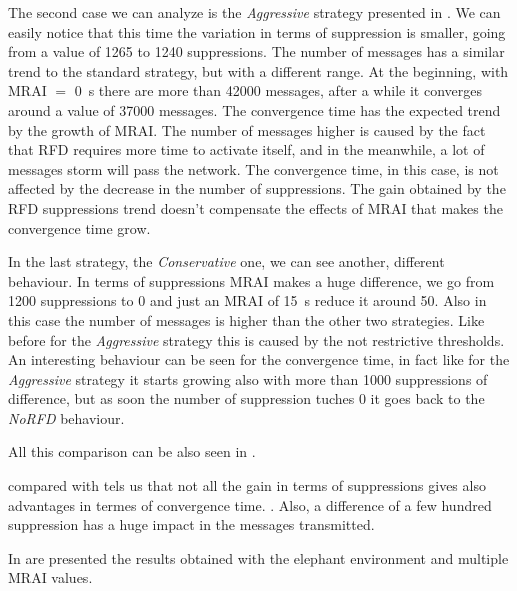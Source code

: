 The second case we can analyze is the \textit{Aggressive} strategy presented
in .
We can easily notice that this time the variation in terms of suppression is smaller,
going from a value of \num{1265} to \num{1240} suppressions.
The number of messages has a similar trend to the standard strategy, but with
a different range.
At the beginning, with \ac{MRAI} $=$ \SI{0}{\second} there are more than \num{42000}
messages, after a while it converges around a value of \num{37000} messages.
The convergence time has the expected trend by the growth of \ac{MRAI}.
The number of messages higher is caused by the fact that \ac{RFD} requires more time
to activate itself, and in the meanwhile, a lot of messages storm will pass the
network.
The convergence time, in this case, is not affected by the decrease in the number
of suppressions.
The gain obtained by the \ac{RFD} suppressions trend doesn't compensate the 
effects of \ac{MRAI} that makes the convergence time grow.

In the last strategy, the \textit{Conservative} one, we can see another, different
behaviour.
In terms of suppressions \ac{MRAI} makes a huge difference, we go from \num{1200}
suppressions to \num{0} and just an \ac{MRAI} of \SI{15}{\second} reduce it around
\num{50}.
Also in this case the number of messages is higher than the other two strategies.
Like before for the \textit{Aggressive} strategy this is caused by the not
restrictive thresholds.
An interesting behaviour can be seen for the convergence time, in fact like for
the \textit{Aggressive} strategy it starts growing also with more than \num{1000}
suppressions of difference, but as soon the number of suppression tuches \num{0}
it goes back to the \textit{NoRFD} behaviour.

All this comparison can be also seen in .

 compared with 
tels us that not all the gain in terms of suppressions gives also advantages in 
termes of convergence time.
.
Also, a difference of a few hundred suppression has a huge impact in the messages
transmitted.

In  are presented the results obtained
with the elephant environment and multiple \ac{MRAI} values.

